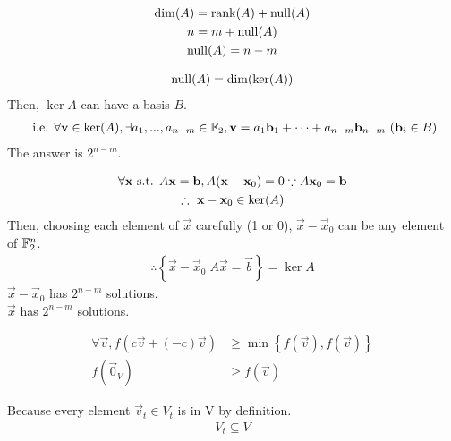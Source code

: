 \documentclass{mathtoolkit}
\begin{document}
\maketitle

\begin{p}
  \item
    \begin{subp}
      \item
        \begin{gather*}
          \mathrm{dim}(A) = \mathrm{rank}(A) + \mathrm{null}(A) \\
          n = m + \mathrm{null}(A) \\
          \mathrm{null}(A) = n - m
        \end{gather*}
      \item
        \begin{gather*}
          \mathrm{null}(A) = \mathrm{dim}(\mathrm{ker}(A))
        \end{gather*}
        Then, $\ker{A}$ can have a basis $B$.
        \begin{gather*}
          \text{i.e.} \forall \vec{v} \in \ker{A},
          \exists a_1, ..., a_{n-m} \in \field{F}_2,
          \vec{v} = a_1 \vec{b}_1 + \dots + a_{n-m} \vec{b}_{n-m}\ (\vec{b}_i \in B)
        \end{gather*}
        \therefore The answer is $2^{n-m}$.
      \item
        \begin{gather*}
          \forall \vec{x} \st A \vec{x} = \vec{b},
          A (\vec{x} - \vec{x}_0) = 0 \because A \vec{x}_0 = \vec{b} \\
          \therefore \vec{x} - \vec{x}_0 \in \ker{A}
        \end{gather*}
        Then, choosing each element of $\vec{x}$ carefully (1 or 0),
        $\vec{x} - \vec{x}_0$ can be any element of $\mathbb{F}^n_2$.
        \begin{gather*}
          \therefore \left\{ \vec{x} - \vec{x}_0 | A \vec{x} = \vec{b} \right\} = \ker{A}
        \end{gather*}
        \therefore $\vec{x} - \vec{x}_0$ has $2^{n-m}$ solutions. \\
        \therefore $\vec{x}$ has $2^{n-m}$ solutions. \\
    \end{subp}

  \item
    \begin{subp}
      \item
        \begin{align*}
          \forall \vec{v},
          f(c \vec{v} + (-c) \vec{v}) & \ge \min \left\{ f(\vec{v}), f(\vec{v}) \right\} \\
          f(\vec{0}_V) & \ge f(\vec{v})
        \end{align*}
      \item
        Because every element $\vec{v}_t \in V_t$ is in V by definition.
        \begin{gather*}
          V_t \subseteq V
        \end{gather*}
    \end{subp}


\end{p}
\end{document}
